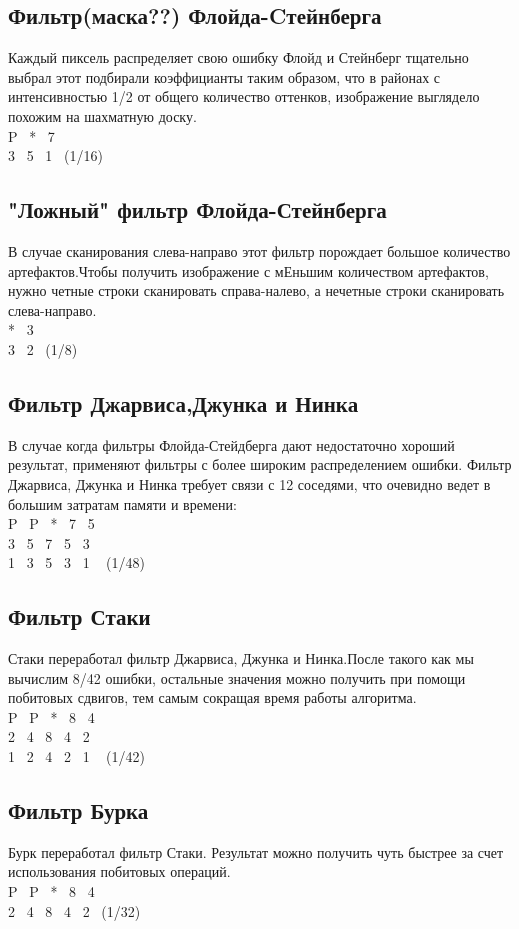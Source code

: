   \subsection{Фильтр(маска??) Флойда-Cтейнберга }
  Каждый пиксель распределяет свою ошибку Флойд и Стейнберг тщательно выбрал этот подбирали коэффицианты таким образом, что в районах с  интенсивностью 1/2 от общего количество оттенков, изображение выглядело похожим на шахматную доску.\\
  P ~* ~7\\
  3 ~5 ~1~ (1/16)
  \subsection{"Ложный"  фильтр Флойда-Стейнберга }
  В случае сканирования слева-направо этот фильтр порождает большое количество артефактов.Чтобы получить изображение с мЕньшим количеством артефактов, нужно четные строки сканировать справа-налево, а нечетные строки сканировать слева-направо.\\
  *~ 3\\
  3~ 2~ (1/8)
  \subsection{Фильтр Джарвиса,Джунка и Нинка}
    В случае когда фильтры Флойда-Стейдберга дают недостаточно хороший результат, применяют фильтры с более широким распределением ошибки. Фильтр Джарвиса, Джунка и Нинка требует связи с 12 соседями, что очевидно ведет в большим затратам памяти и времени:\\
        P~   P~   *~   7~   5 \\
        3~   5~   7~   5~   3\\
        1~   3~   5~   3~   1 ~   (1/48)
  \subsection{Фильтр Стаки}
  Стаки переработал фильтр Джарвиса, Джунка и Нинка.После такого как мы вычислим 8/42 ошибки, остальные значения можно получить при помощи побитовых сдвигов, тем самым сокращая время работы алгоритма.\\
     P~   P~  *~   8~   4\\
     2~   4~   8~   4~   2\\
     1~  2~   4~   2~   1 ~   (1/42)
  \subsection{Фильтр Бурка}
  Бурк переработал фильтр Стаки. Результат можно получить чуть быстрее за счет использования побитовых операций.\\
           P~ P~ *~   8~   4~  \\           
           2~   4~   8~   4~   2~   (1/32)
        
  
